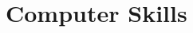 \documentclass[10pt]{article} %
\begin{document}
\begin{paracol}{2}
\begin{supertabular}{rl}

\end{supertabular}


%
%
%
%
%
%	
%	
%	
%	
%	
%	


\section{Computer Skills} 






\end{paracol}
\end{document}
